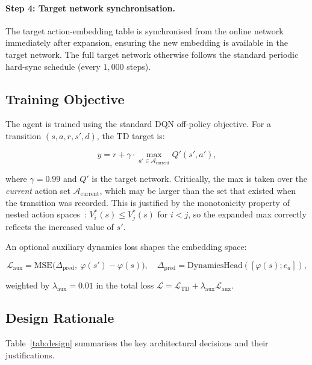 \documentclass{article}
\begin{document}
\paragraph{Step 4: Target network synchronisation.} The target action-embedding table is synchronised from the online network immediately after expansion, ensuring the new embedding is available in the target network. The full target network otherwise follows the standard periodic hard-sync schedule (every $1{,}000$ steps).

\subsection{Training Objective}

The agent is trained using the standard DQN off-policy objective. For a transition $(s, a, r, s', d)$, the TD target is:

\begin{equation}
y = r + \gamma \cdot \max_{a' \in \mathcal{A}_\text{current}} Q'(s', a'), \label{eq:td_target}
\end{equation}

where $\gamma=0.99$ and $Q'$ is the target network. Critically, the max is taken over the \emph{current} action set $\mathcal{A}_\text{current}$, which may be larger than the set that existed when the transition was recorded. This is justified by the monotonicity property of nested action spaces~\cite{farquhar2020growing}: $V^*_i(s) \leq V^*_j(s)$ for $i < j$, so the expanded max correctly reflects the increased value of $s'$.

An optional auxiliary dynamics loss shapes the embedding space:

\begin{equation}
\mathcal{L}_\text{aux} = \text{MSE}\big(\Delta_\text{pred},\ \varphi(s') - \varphi(s)\big), \quad \Delta_\text{pred} = \text{DynamicsHead}([\varphi(s); e_a]),
\end{equation}

weighted by $\lambda_\text{aux}=0.01$ in the total loss $\mathcal{L} = \mathcal{L}_\text{TD} + \lambda_\text{aux} \mathcal{L}_\text{aux}$.

\subsection{Design Rationale}

Table~\ref{tab:design} summarises the key architectural decisions and their justifications.
\end{document}
